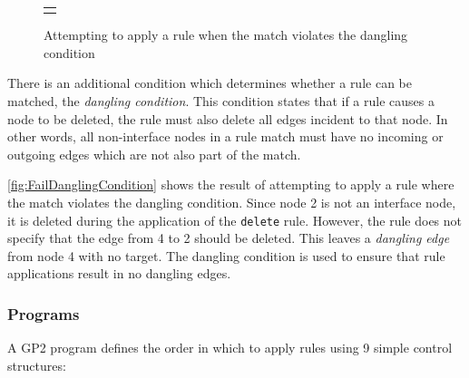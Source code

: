 \documentclass[authoryearcitations]{UoYCSproject}
\newenvironment{nscenter}
    {\parskip=0pt\par\nopagebreak\centering}
    {\par\noindent\ignorespacesafterend}
\begin{document}
\begin{figure}
\begin{framed}
\begin{nscenter}
\begin{tabular}{l}
\begin{tikzpicture}
            \end{tikzpicture}

        \end{tabular}
    \end{nscenter}
    \end{framed}
    \caption{Attempting to apply a rule when the match violates the dangling condition}
    \label{fig:FailDanglingCondition}
\end{figure}

There is an additional condition which determines whether a rule can be matched, the
\emph{dangling condition}. This condition states that if a rule causes a node to be
deleted, the rule must also delete all edges incident to that node. In
other words, all non-interface nodes in a rule match must have no incoming or outgoing
edges which are not also part of the match.

\autoref{fig:FailDanglingCondition} shows the result of attempting to apply a rule
where the match violates the dangling condition. Since node 2 is not an interface
node, it is deleted during the application of the \texttt{delete} rule. However, the
rule does not specify that the edge from 4 to 2 should be deleted. This leaves a
\emph{dangling edge} from node 4 with no target. The dangling condition is used to
ensure that rule applications result in no dangling edges.


\subsubsection{Programs}
\label{sec:Programs}

A GP2 program defines the order in which to apply rules using 9 simple control
structures:
\end{document}

